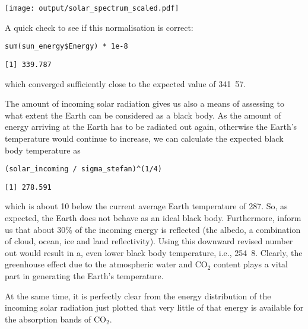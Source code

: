 \documentclass[10pt,a4paper,titlepage]{article}
\begin{document}
\texttt{[image: output/solar\_spectrum\_scaled.pdf]}

A quick check to see if this normalisation is correct:
\begin{lstlisting}
sum(sun_energy$Energy) * 1e-8
\end{lstlisting}

\begin{verbatim}
[1] 339.787
\end{verbatim}

which converged sufficiently close to the expected value of
\unit{341.57}{\watt\per\metre\squared}.

The amount of incoming solar radiation gives us also a means of
assessing to what extent the Earth can be considered as a black
body. As the amount of energy arriving at the Earth has to be radiated
out again, otherwise the Earth's temperature would continue to
increase, we can calculate the expected black body temperature as
\begin{lstlisting}
(solar_incoming / sigma_stefan)^(1/4)
\end{lstlisting}

\begin{verbatim}
[1] 278.591
\end{verbatim}

which is about \unit{10}{\kelvin} below the current average Earth
temperature of \unit{287}{\kelvin}. So, as expected, the Earth does
not behave as an ideal black body. Furthermore,
\citet{trenberth-al09:budget} inform us that about 30\% of the incoming
energy is reflected (the albedo, a combination of cloud, ocean, ice
and land reflectivity). Using this downward revised number out would
result in a, even lower black body temperature, i.e.,
\unit{254.8}{\kelvin}. Clearly, the greenhouse effect due to the
atmospheric water and CO$_{\text{2}}$ content plays a vital part in generating
the Earth's temperature.

At the same time, it is perfectly clear from the energy distribution
of the incoming solar radiation just plotted that very little of that
energy is available for the absorption bands of CO$_{\text{2}}$.
\end{document}
